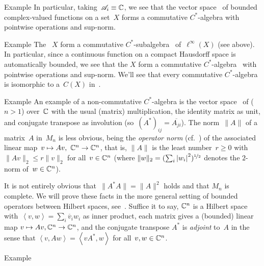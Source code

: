 \documentclass[main]{subfiles}
\begin{document}
\begin{parsec}
\begin{point}{Example}
In particular,
taking~$\mathscr{A}_i\equiv \mathbb{C}$,
we see that
the vector space~ of bounded complex-valued functions
on a set~$X$ forms a commutative $C^*$-algebra
with pointwise operations and sup-norm.
\end{point}
\begin{point}{Example}%
The ~$X$
form a commutative $C^*$-subalgebra~
of~$\ell^\infty(X)$ (see above).
In particular,
since a continuous function on a compact Hausdorff space is 
automatically bounded,
we see that the  $X$
form a commutative $C^*$-algebra~
with pointwise operations and sup-norm.
We'll see that every commutative $C^*$-algebra
is isomorphic to a~$C(X)$
in~.
\end{point}
\begin{point}{Example}%
An example of a non-commutative
$C^*$-algebra
is
the vector space~
of  ($n>1$) over~$\mathbb{C}$
with the usual (matrix) multiplication,
the identity matrix as unit,
and conjugate transpose
as involution
(so~$(A^*)_{ij} = \overline{A_{ji}}$).
The norm~$\|A\|$ of a matrix~$A$ in~$M_n$
is less obvious,
being
the \emph{operator norm}
(cf.~)
of the associated linear map~$v\mapsto Av,\ \C^n\to\C^n$,
that is,
$\|A\|$ is
the least number~$r\geq 0$
with $\|Av\|_2\leq r\|v\|_2$
for all~$v\in \mathbb{C}^n$
(where $\|w\|_2=(\sum_i \left|w_i\right|^2)^{\nicefrac{1}{2}}$
denotes the $2$-norm
of~$w\in \mathbb{C}^n$).

It is not entirely obvious that~$\|A^*A\|=\|A\|^2$
holds
and that $M_n$ is complete.
We will prove these facts in the more general setting
of bounded operators between Hilbert spaces, 
see~.
Suffice it to say, $\mathbb{C}^n$ is a Hilbert space
with~$\left<v,w\right>=\sum_i \overline{v}_iw_i$
as inner product,
each matrix gives a (bounded) linear map $v\mapsto Av,\mathbb{C}^n\to \mathbb{C}^n$,
and the conjugate transpose $A^*$ is \emph{adjoint} to~$A$
in the sense that $\left<v,Aw\right> = \left<vA^*,w\right>$
for all~$v,w\in\mathbb{C}^n$.
\end{point}
\begin{point}{Example}%
\end{point}
\end{parsec}
\end{document}
